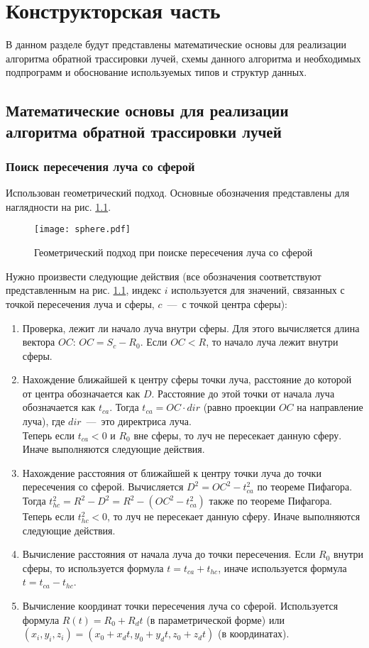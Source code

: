 \chapter{Конструкторская часть}
В данном разделе будут представлены математические основы для реализации алгоритма обратной трассировки лучей, схемы данного алгоритма и необходимых подпрограмм и обоснование используемых типов и структур данных.

\section{Математические основы для реализации алгоритма обратной трассировки лучей}
\subsection{Поиск пересечения луча со сферой}
Использован геометрический подход. Основные обозначения представлены для наглядности на рис. \ref{img:sphere}.

\begin{figure}[h!]
    \centering
    \texttt{[image: sphere.pdf]}
    \caption{Геометрический подход при поиске пересечения луча со сферой}
    \label{img:sphere}
\end{figure}

Нужно произвести следующие действия (все обозначения соответствуют представленным на рис. \ref{img:sphere}, индекс $i$ используется для значений, связанных с точкой пересечения луча и сферы, $c$~---~с точкой центра сферы):
\begin{enumerate}[label={\arabic*)}]
	\item Проверка, лежит ли начало луча внутри сферы. Для этого вычисляется длина вектора $OC$: $OC = S_c - R_0$. Если $OC < R$, то начало луча лежит внутри сферы.
	\item Нахождение ближайшей к центру сферы точки луча, расстояние до которой от центра обозначается как $D$. Расстояние до этой точки от начала луча обозначается как $t_{ca}$. Тогда $t_{ca} = OC \cdot dir$ (равно проекции $OC$ на направление луча), где $dir$~---~это директриса луча. \\ Теперь если $t_{ca} < 0$ и $R_0$ вне сферы, то луч не пересекает данную сферу. Иначе выполняются следующие действия.
	\item Нахождение расстояния от ближайшей к центру точки луча до точки пересечения со сферой. Вычисляется $D^2 = OC^2 - t_{ca}^2$ по теореме Пифагора. Тогда $t_{hc}^2 = R^2 - D^2 = R^2 - (OC^2 - t_{ca}^2)$ также по теореме Пифагора. \\ Теперь если $t_{hc}^2 < 0$, то луч не пересекает данную сферу. Иначе выполняются следующие действия.
	\item Вычисление расстояния от начала луча до точки пересечения. Если $R_0$ внутри сферы, то используется формула $t = t_{ca} + t_{hc}$, иначе используется формула $t = t_{ca} - t_{hc}$. 
	\item Вычисление координат точки пересечения луча со сферой. Используется формула $R(t) = R_0 + R_dt$ (в параметрической форме) или $(x_i, y_i, z_i) = (x_0 + x_dt, y_0 + y_dt, z_0 + z_dt)$ (в координатах).
\end{enumerate}

